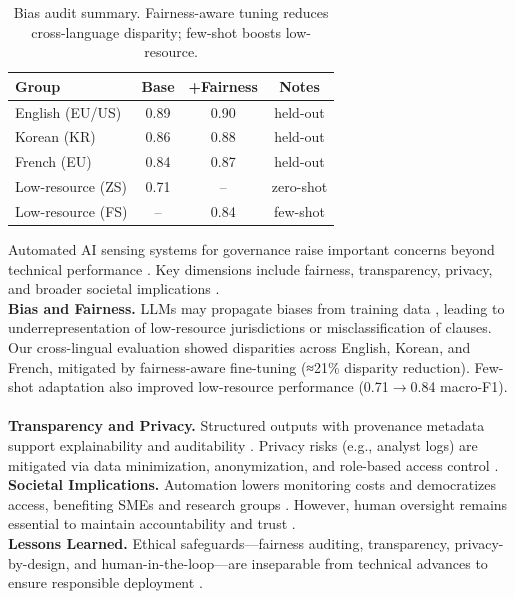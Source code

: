 {}{%


\begin{table}[t]
\centering
\small
\begin{tabular}{lccc}
\toprule
\textbf{Group} & \textbf{Base} & \textbf{+Fairness} & \textbf{Notes} \\
\midrule
English (EU/US)   & 0.89 & 0.90 & held-out \\
Korean (KR)       & 0.86 & 0.88 & held-out \\
French (EU)       & 0.84 & 0.87 & held-out \\
Low-resource (ZS) & 0.71 & --   & zero-shot \\
Low-resource (FS) & --   & 0.84 & few-shot \\
\bottomrule
\end{tabular}

\caption{Bias audit summary. Fairness-aware tuning reduces cross-language disparity; few-shot boosts low-resource.}
\label{tab:bias_audit}
\end{table}

Automated AI sensing systems for governance raise important concerns beyond technical performance \cite{weidinger2021taxonomy, bender2021stochastic}. 
Key dimensions include fairness, transparency, privacy, and broader societal implications \cite{bommasani2021foundation}.
~\\
\textbf{Bias and Fairness. } LLMs may propagate biases from training data \cite{weidinger2021taxonomy, bender2021stochastic}, leading to underrepresentation of low-resource jurisdictions or misclassification of clauses. 
Our cross-lingual evaluation showed disparities across English, Korean, and French, mitigated by fairness-aware fine-tuning (≈21\% disparity reduction). 
Few-shot adaptation also improved low-resource performance (0.71$\to$0.84 macro-F1).
~\\
\textbf{Transparency and Privacy.} Structured outputs with provenance metadata support explainability and auditability \cite{mitchell2021modelcards}. 
Privacy risks (e.g., analyst logs) are mitigated via data minimization, anonymization, and role-based access control \cite{weidinger2021taxonomy}.
~\\
\textbf{Societal Implications.} Automation lowers monitoring costs and democratizes access, benefiting SMEs and research groups \cite{nllb2022}. 
However, human oversight remains essential to maintain accountability and trust \cite{mitchell2021modelcards}.
~\\
\textbf{Lessons Learned.} Ethical safeguards—fairness auditing, transparency, privacy-by-design, and human-in-the-loop—are inseparable from technical advances to ensure responsible deployment \cite{bender2021stochastic}.

}